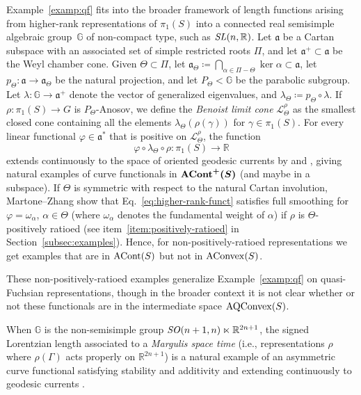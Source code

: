\begin{example}
  \label{examp:higher-rank}
Example~\ref{examp:qf} fits into the broader framework of length
functions arising from higher-rank representations of
$\pi_1(S)$ into a connected real semisimple algebraic group~$\mathbb{G}$ of
non-compact type, such as $\operatorname{\mathit{SL}}(n,\mathbb{R})$.
Let $\mathfrak{a}$ be a Cartan subspace with an associated set of simple restricted
roots $\Pi$, and let $\mathfrak{a}^+ \subset \mathfrak{a}$ be the Weyl chamber cone. Given $\Theta\subset\Pi$, let
$\mathfrak{a}_\Theta \coloneqq \bigcap_{\alpha \in \Pi-\Theta} \ker
\alpha \subset\mathfrak{a}$, let $p_\Theta \colon \mathfrak{a} \to
\mathfrak{a}_\Theta$ be the natural projection, and let
$P_\Theta<\mathbb{G}$ be the
parabolic subgroup. Let $\lambda \colon \mathbb{G} \to \mathfrak{a}^+$ denote the vector of generalized eigenvalues, and $\lambda_\Theta \coloneqq p_\Theta \circ \lambda$.
If
$\rho\colon\pi_1(S)\to G$ is $P_\Theta$-Anosov, we define the
\emph{Benoist limit cone} $\mathcal{L}_\Theta^\rho$ as the smallest closed cone containing all the elements $\lambda_\Theta(\rho(\gamma))$ for $\gamma \in \pi_1(S)$.
For every 
linear functional
$\varphi\in\mathfrak{a}^*$ that is positive on $\mathcal{L}_\Theta^\rho$, the function
\begin{equation}\label{eq:higher-rank-funct}
\varphi\circ\lambda_\Theta\circ\rho\colon\pi_1(S)\to\mathbb{R}
\end{equation}
extends continuously to the space of oriented geodesic currents
by \cite[Appendix~A]{JMG26:Horoboundary}
and \cite[Section~7]{CMGR26:GreenMetrics}, giving natural examples of
curve functionals in $\bm{\mathrm{ACont}^+(S)}$ (and maybe in a subspace).
If $\Theta$ is symmetric with respect to the natural Cartan involution, Martone--Zhang
\cite[Theorem~1.1]{MZ19:PositivelyRatioed} show
that Eq.~\eqref{eq:higher-rank-funct}
satisfies full smoothing for $\varphi=\omega_\alpha$, $\alpha \in
\Theta$
(where $\omega_\alpha$ denotes the fundamental weight of $\alpha$) if
$\rho$ is $\Theta$-positively ratioed
(see
item~\ref{item:positively-ratioed} in Section~\ref{subsec:examples}).
Hence, for non-positively-ratioed representations we get examples that
are in $\mathrm{ACont}(S)$ but not in
$\mathrm{AConvex}(S)$.

These non-positively-ratioed examples generalize
Example~\ref{examp:qf} on
quasi-Fuchsian representations, though in the broader context it is
not clear whether or not these functionals are in the
intermediate space
$\mathrm{AQConvex}(S)$.

When $\mathbb{G}$ is the non-semisimple group $\operatorname{\mathit{SO}}(n+1,n) \ltimes \mathbb{R}^{2n+1}$, the signed
Lorentzian length associated to a \emph{Margulis space time} (i.e.,
representations $\rho$ where $\rho(\Gamma)$ acts properly on
$\mathbb{R}^{2n+1}$) \cite{GM00:FlatLorentzian} is a natural example
of an asymmetric curve functional satisfying stability and additivity
and extending continuously to geodesic
currents \cite[Section~6.1]{GML09:ProperAffine}\cite{Lab01:Diffusion}.
\end{example}

